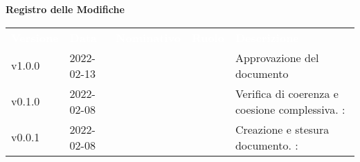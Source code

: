 

{\LARGE{\textbf{Registro delle Modifiche}}} \\
\begin{table}[!htbp]
\renewcommand{\arraystretch}{1.5}
\begin{tabular}{ m{}<{\centering}  m{}<{\centering}  m{}<{\centering}  m{}<{\centering}  m{}<{\centering} }
	\rowcolor{darkblue}
	\textcolor{white}{\textbf{Versione}} &\textcolor{white}{\textbf{Data}}& \textcolor{white}{\textbf{Nominativo}} & \textcolor{white}{\textbf{Ruolo}}&\textcolor{white}{\textbf{Descrizione}}\\ 

	v1.0.0 & 2022-02-13 & \EP & \RE & Approvazione del documento \\

	v0.1.0& 2022-02-08 & \GC & \AN & Verifica di coerenza e coesione complessiva. \VE: \textit{\PV}\\

	v0.0.1& 2022-02-08& \GC &\AN & Creazione e stesura documento. \VE: \textit{\PV}\\

\end{tabular}
\end{table}

\pagebreak